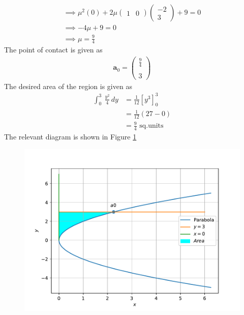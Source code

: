\documentclass[12pt]{article}
\providecommand{\brak}[1]{\ensuremath{\left(#1\right)}}
\providecommand{\sbrak}[1]{\ensuremath{{}\left[#1\right]}}
\newcommand{\myvec}[1]{\ensuremath{\begin{pmatrix}#1\end{pmatrix}}}
\let\vec\mathbf
\begin{document}
\begin{enumerate}
\begin{multline}
	\implies \mu^2\brak{0}+2\mu\myvec{1 & 0}\myvec{-2 \\3} + 9 = 0 \\
	\implies -4\mu + 9 = 0  \\
	\implies \mu  = \frac{9}{4} 
\end{multline}
The point of contact is given as
\begin{align}
	\vec{a}_0 = \myvec{\frac{9}{4}  \\[1pt] \\ 3}
\end{align}
The desired area of the region is given as
\begin{align}
	\int_{0}^{3} \ \frac{y^2}{4} \,dy &= \frac{1}{12}\sbrak{y^3}_{0}^{3} \\
	&= \frac{1}{12}\brak{27-0} \\
	&= \frac{9}{4} \text{ sq.units}
\end{align}
The relevant diagram is shown in Figure \ref{fig:Fig1}
\begin{figure}[!h]
	\begin{center}
		\includegraphics[width=\columnwidth]{figs/problem13.pdf}
	\end{center}
\caption{}
\label{fig:Fig1}
\end{figure}
\end{enumerate}
\end{document}
